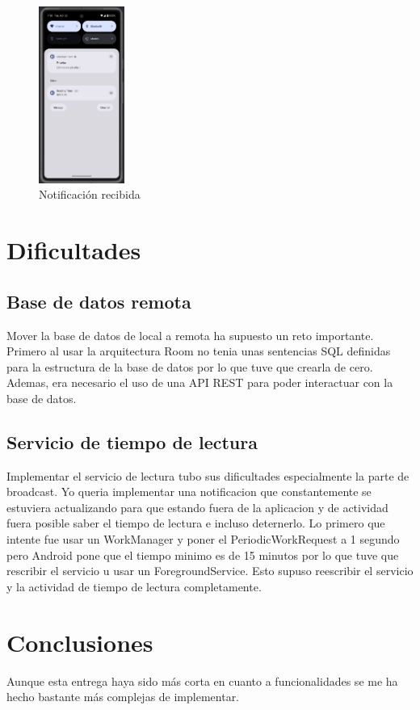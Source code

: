 \documentclass[a4paper,11pt]{report}
\begin{document}
      \begin{figure}[H]
        \centering
        \includegraphics[width=0.25\textwidth]{.img/mensaje_notificacion.png}
        \caption{Notificación recibida}
        \label{fig:mensaje-notificacion}
      \end{figure}
  \chapter{Dificultades}
    \section{Base de datos remota}
      Mover la base de datos de local a remota ha supuesto un reto importante.
      Primero al usar la arquitectura Room no tenia unas sentencias SQL definidas para la estructura de la base de datos por lo que tuve que crearla de cero.
      Ademas, era necesario el uso de una API REST para poder interactuar con la base de datos.
    \section{Servicio de tiempo de lectura}
      Implementar el servicio de lectura tubo sus dificultades especialmente la parte de broadcast.
      Yo queria implementar una notificacion que constantemente se estuviera actualizando para que estando fuera de la aplicacion y de actividad fuera posible saber el tiempo de lectura e incluso deternerlo.
      Lo primero que intente fue usar un WorkManager y poner el PeriodicWorkRequest a 1 segundo pero Android pone que el tiempo minimo es de 15 minutos por lo que tuve que rescribir el servicio u usar un ForegroundService.
      Esto supuso reescribir el servicio y la actividad de tiempo de lectura completamente.
  \chapter{Conclusiones}
    Aunque esta entrega haya sido más corta en cuanto a funcionalidades se me ha hecho bastante más complejas de implementar.
  \printbibliography[title=Bibliografía]
\end{document}
